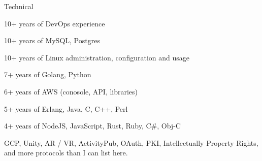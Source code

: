 \documentclass[10pt,letterpaper]{article}
\newenvironment{indentsection}[1]%
{\begin{list}{}%
  {\setlength{\leftmargin}{#1}}%
  \item[]%
}
{\end{list}}
\begin{document}
\begin{indentsection}{\parindent}
Technical
\begin{itemize*}
  \item 10+ years of DevOps experience
  \item 10+ years of MySQL, Postgres
  \item 10+ years of Linux administration, configuration and usage
  \item 7+ years of Golang, Python
  \item 6+ years of AWS (conosole, API, libraries)
  \item 5+ years of Erlang, Java, C, C++, Perl
  \item 4+ years of NodeJS, JavaScript, Rust, Ruby, C\#, Obj-C
  \item GCP, Unity, AR / VR, ActivityPub, OAuth, PKI, Intellectually Property Rights, and more protocols than I can list here.
\end{itemize*}

\end{indentsection}
\end{document}
